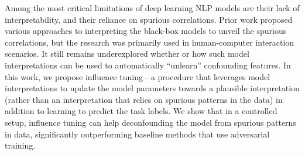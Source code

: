 Among the most critical limitations of deep learning NLP models are their lack of interpretability, and their reliance on spurious correlations. Prior work proposed various approaches to interpreting the black-box models to unveil the spurious correlations, but the research was primarily used in human-computer interaction scenarios. It still remains underexplored whether or how such model interpretations can be used to automatically ``unlearn'' confounding features. In this work, we propose influence tuning---a procedure that leverages model interpretations to update the model parameters towards a plausible interpretation (rather than an interpretation that relies on spurious patterns in the data) in addition to learning to predict the task labels. We show that in a controlled setup, influence tuning can help deconfounding the model from spurious patterns in data, significantly outperforming baseline methods that use adversarial training.
